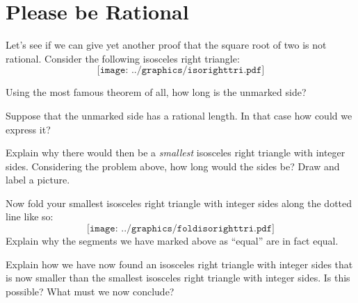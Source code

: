 \newpage
\section{Please be Rational}

Let's see if we can give yet another proof that the square root of two
is not rational. Consider the following isosceles right triangle:
\[
\texttt{[image: ../graphics/isorighttri.pdf]}
\]
\begin{prob}
Using the most famous theorem of all, how long is the unmarked side?
\end{prob}

\begin{prob} 
Suppose that the unmarked side has a rational length. In that case how
could we express it?
\end{prob}

\begin{prob}
Explain why there would then be a \textit{smallest} isosceles right
triangle with integer sides. Considering the problem above, how long
would the sides be? Draw and label a picture.
\end{prob}

\begin{prob}
Now fold your smallest isosceles right triangle with integer sides
along the dotted line like so:
\[
\texttt{[image: ../graphics/foldisorighttri.pdf]}
\]
Explain why the segments we have marked above as ``equal'' are in fact
equal.
\end{prob}

\begin{prob}
Explain how we have now found an isosceles right triangle with integer
sides that is now smaller than the smallest isosceles right triangle
with integer sides. Is this possible? What must we now conclude?
\end{prob}
